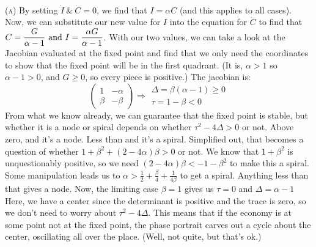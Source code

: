 \documentclass[11pt,answers]{exam}
\begin{document}
\begin{questions}
\begin{solution}
\\ \textsc{(a)} By setting $\dot{I} ~ \& ~ \dot{C} = 0$, we find that $I = \alpha C$ (and this applies to all cases).  Now, we can substitute our new value for $I$ into the equation for $\dot{C}$ to find that $\displaystyle C = \frac{G}{\alpha - 1} \hbox{ and } I = \frac{\alpha G}{\alpha - 1}$.  With our two values, we can take a look at the Jacobian evaluated at the fixed point and find that we only need the coordinates to show that the fixed point will be in the first quadrant. (It is, $\alpha > 1$ so $\alpha - 1 > 0$, and $G \geq 0$, so every piece is positive.)  The jacobian is:
\[
\left(\begin{array}{cc} 1 & -\alpha \\ \beta & -\beta \end{array}\right) \Rightarrow \begin{array}{c} \Delta = \beta(\alpha - 1) \geq 0 \\ \tau = 1 - \beta < 0 \end{array}
\]
From what we know already, we can guarantee that the fixed point is stable, but whether it is a node or spiral depends on whether $\tau^2 - 4\Delta > 0$ or not.  Above zero, and it's a node.  Less than and it's a spiral.  Simplified out, that becomes a question of whether $1 + \beta^2 + (2 - 4\alpha)\beta > 0$ or not.  We know that $1 + \beta^2$ is unquestionably positive, so we need $(2 - 4\alpha)\beta < -1 - \beta^2$ to make this a spiral.  Some manipulation leads us to $\alpha > \frac{1}{2} + \frac{\beta}{4} + \frac{1}{4\beta}$ to get a spiral.  Anything less than that gives a node.  Now, the limiting case $\beta = 1$ gives us $\tau = 0$ and $\Delta = \alpha - 1$  Here, we have a center since the determinant is positive and the trace is zero, so we don't need to worry about $\tau^2 - 4\Delta$.  This means that if the economy is at some point not at the fixed point, the phase portrait carves out a cycle about the center, oscillating all over the place. (Well, not quite, but that's ok.) 

\vspace{1em}


\end{solution}
\end{questions}
\end{document}
